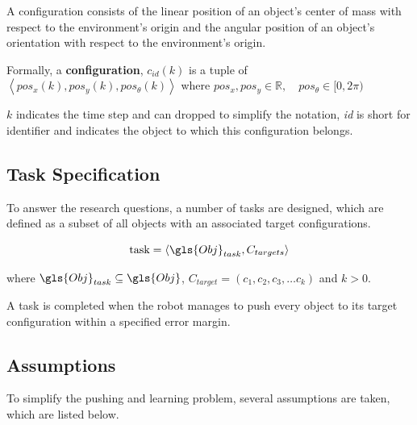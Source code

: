 A configuration consists of the linear position of an object's center of mass with respect to the environment's origin and the angular position of an object's orientation with respect to the environment's origin.\bs

Formally, a \textbf{configuration}, $c_{id}(k)$ is a tuple of $\left\langle pos_x(k), pos_y(k), pos_\theta(k)\right\rangle$ \quad where $pos_x, pos_y \in \mathbb{R}, \quad  pos_\theta \in [0, 2\pi)$ 

$k$ indicates the time step and can dropped to simplify the notation, \textit{id} is short for identifier and indicates the object to which this configuration belongs.\\

\subsection{Task Specification}%
\label{subsec:task}
To answer the research questions, a number of tasks are designed, which are defined as a subset of all objects with an associated target configurations.\bs

\[\text{task} = \left\langle \gls{Obj}_{task}, C_{targets} \right\rangle\]


where $\gls{Obj}_{task} \subseteq \gls{Obj}$, $C_{target} = (c_1, c_2, c_3, \dots c_k)$ and $k>0$.\bs

A task is completed when the robot manages to push every object to its target configuration within a specified error margin.

\subsection{Assumptions}%
\label{subsec:assumptions}
To simplify the pushing and learning problem, several assumptions are taken, which are listed below.\bs

